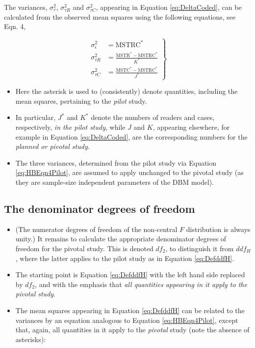 \documentclass[
]{book}
\providecommand{\tightlist}{%
  \setlength{\itemsep}{0pt}\setlength{\parskip}{0pt}}
\begin{document}
The variances, \(\sigma_{\tau}^2\), \(\sigma_{\tau R}^2\) and \(\sigma_{\tau C}^2\), appearing in Equation \eqref{eq:DeltaCoded}, can be calculated from the observed mean squares using the following equations, see \citep{RN1476} Eqn. 4,

\begin{equation}
\left.\begin{array}{rl}
\sigma_{\epsilon}^2&={\text{MSTRC}}^*\\[1em] 
\sigma_{\tau R}^2&=\displaystyle\frac{{\text{MSTR}}^*-{\text{MSTRC}}^*}{K^*}\\[1em]
\sigma_{\tau C}^2&=\displaystyle\frac{{\text{MSTC}}^*-{\text{MSTRC}}^*}{J^*}
\end{array}\right\}
\label{eq:HBEqn4Pilot}
\end{equation}

\begin{itemize}
\tightlist
\item
  Here the asterisk is used to (consistently) denote quantities, including the mean squares, pertaining to the \emph{pilot} study.
\item
  In particular, \(J^*\) and \(K^*\) denote the numbers of readers and cases, respectively, \emph{in the pilot study}, while \(J\) and \(K\), appearing elsewhere, for example in Equation \eqref{eq:DeltaCoded}, are the corresponding numbers for the \emph{planned or pivotal study}.
\item
  The three variances, determined from the pilot study via Equation \eqref{eq:HBEqn4Pilot}, are assumed to apply unchanged to the pivotal study (as they are sample-size independent parameters of the DBM model).
\end{itemize}

\hypertarget{the-denominator-degrees-of-freedom}{%
\subsection{The denominator degrees of freedom}\label{the-denominator-degrees-of-freedom}}

\begin{itemize}
\tightlist
\item
  (The numerator degrees of freedom of the non-central \(F\) distribution is always unity.) It remains to calculate the appropriate denominator degrees of freedom for the pivotal study. This is denoted \(df_2\), to distinguish it from \(ddf_H\), where the latter applies to the pilot study as in Equation \eqref{eq:DefddfH}.
\item
  The starting point is Equation \eqref{eq:DefddfH} with the left hand side replaced by \(df_2\), and with the emphasis that \emph{all quantities appearing in it apply to the pivotal study}.
\item
  The mean squares appearing in Equation \eqref{eq:DefddfH} can be related to the variances by an equation analogous to Equation \eqref{eq:HBEqn4Pilot}, except that, again, all quantities in it apply to the \emph{pivotal} study (note the absence of asterisks):
\end{itemize}
\end{document}
